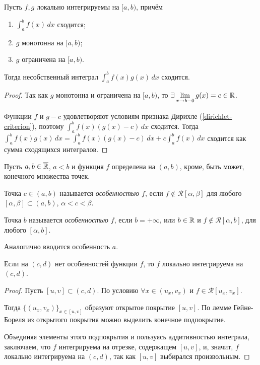 \begin{theorem}
    \label{abel-criterion}

    Пусть $f, g$ локально интегрируемы на $[a, b)$, причём
    \begin{enumerate}
        \item $\int_a^b f(x)\, dx$ сходится;
        \item $g$ монотонна на $[a, b)$;
        \item $g$ ограничена на $[a, b)$.
    \end{enumerate}

    Тогда несобственный интеграл $\int_a^b f(x)g(x)\, dx$ сходится.

    \begin{proof}
        Так как $g$ монотонна и ограничена на $[a, b)$, то $\displaystyle \exists \lim_{x \rightarrow b - 0} g(x) = c \in \mathbb{R}$.
        
        Функции $f$ и $g - c$ удовлетворяют условиям признака Дирихле (\ref{dirichlet-criterion}), поэтому $\int_a^b f(x)\left(g(x) - c\right)\, dx$ сходится. Тогда $\int_a^b f(x)g(x)\, dx = \int_a^b f(x)(g(x) - c)\, dx + c \int_a^b f(x)\, dx$ сходится как сумма сходящихся интегралов.
    \end{proof}
\end{theorem}

\begin{definition}
    Пусть $a, b \in \overline{\mathbb{R}}$, $a < b$ и функция $f$ определена на $(a, b)$, кроме, быть может, конечного множества точек.

    Точка $c \in (a, b)$ называется \emph{особенностью $f$}, если $f \not\in \mathcal{R}[\alpha, \beta]$ для любого $[\alpha, \beta] \subset (a, b)$, $\alpha < c < \beta$.

    Точка $b$ называется \emph{особенностью $f$}, если $b = +\infty$, или $b \in \mathbb{R}$ и $f \not\in \mathcal{R}[\alpha, b]$, для любого $[\alpha, b]$.

    Аналогично вводится особенность $a$.
\end{definition}

\begin{note}
    Если на $(c, d)$ нет особенностей функции $f$, то $f$ локально интегрируема на $(c, d)$.

    \begin{proof}
        Пусть $[u, v] \subset (c, d)$. По условию $\forall x \in (u_x, v_x)$ и $f \in \mathcal{R}[u_x, v_x]$.

        Тогда $\{(u_x, v_x)\}_{x \in [u, v]}$ образуют открытое покрытие $[u, v]$. По лемме Гейне-Бореля из открытого покрытия можно выделить конечное подпокрытие.

        Объединяя элементы этого подпокрытия и пользуясь аддитивностью интеграла, заключаем, что $f$ интегрируема на отрезке, содержащем $[u, v]$, и, значит, $f$ локально интегрируема на $(c, d)$, так как $[u, v]$ выбирался произвольным.
    \end{proof}
\end{note}

